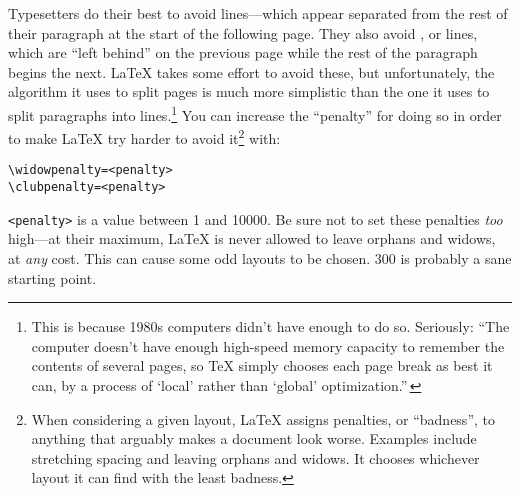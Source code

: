 Typesetters do their best to avoid  lines---which appear
separated from the rest of their paragraph at the start of the following
page.
They also avoid , or  lines,
which are ``left behind'' on the previous page while the rest of the paragraph
begins the next.
\LaTeX{} takes some effort to avoid these, but unfortunately, the algorithm it
uses to split pages is much more simplistic than the one it uses
to split paragraphs into lines.\punckern\footnote{This is because
1980s computers didn't have enough  to do so. Seriously:
``The computer doesn't have enough high-speed memory capacity to remember the
contents of several pages,
so \TeX{} simply chooses each page break as best it can, by a process of
`local' rather than `global' optimization.\quotekern''\,}
You can increase the ``penalty'' for doing so in order to make \LaTeX{}
try harder to avoid it\footnote{When considering a given layout,
\LaTeX{} assigns penalties, or ``badness''\quotekern,
to anything that arguably makes a document look worse.
Examples include stretching spacing and leaving orphans and widows.
It chooses whichever layout it can find with the least badness.}
with:
\begin{leftfigure}
\begin{lstlisting}
\widowpenalty=<penalty>
\clubpenalty=<penalty>
\end{lstlisting}
\end{leftfigure}
\verb|<penalty>| is a value between 1 and 10000.
Be sure not to set these penalties \emph{too} high---at their maximum,
\LaTeX{} is never allowed to leave orphans and widows, at \emph{any} cost.
This can cause some odd layouts to be chosen.
300 is probably a sane starting point.

